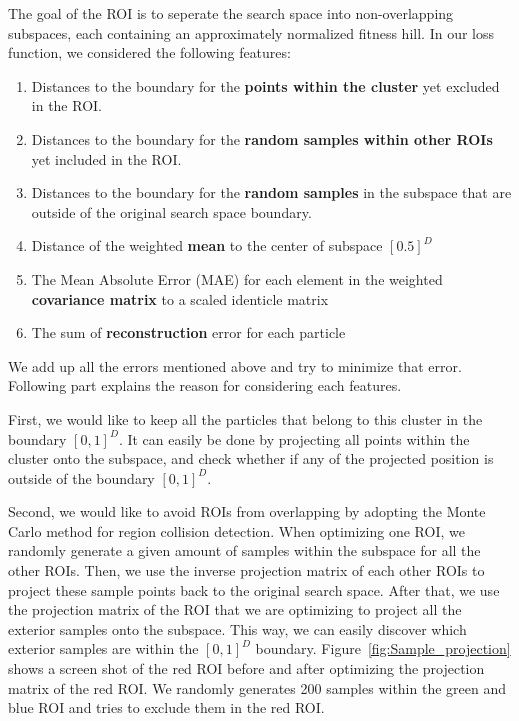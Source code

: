 The goal of the ROI is to seperate the search space into non-overlapping subspaces, 
each containing an approximately normalized fitness hill.
In our loss function, we considered the following features:
\begin{enumerate}
    \item Distances to the boundary for the \textbf{points within the cluster} yet excluded in the ROI.
    \item Distances to the boundary for the \textbf{random samples within other ROIs} yet included in the ROI.
    \item Distances to the boundary for the \textbf{random samples} in the subspace that are outside of the original search space boundary.
    \item Distance of the weighted \textbf{mean} to the center of subspace $[0.5]^D$
    \item The Mean Absolute Error (MAE) for each element in the weighted \textbf{covariance matrix} to a scaled identicle matrix
    \item The sum of \textbf{reconstruction} error for each particle 
\end{enumerate} 
We add up all the errors mentioned above and try to minimize that error. 
Following part explains the reason for considering each features.

First, we would like to keep all the particles that belong to this cluster in the boundary $[0,1]^D$.
It can easily be done by projecting all points within the cluster onto the subspace, 
and check whether if any of the projected position is outside of the boundary $[0,1]^D$.

Second, we would like to avoid ROIs from overlapping by adopting the Monte Carlo method for region collision detection. 
When optimizing one ROI, we randomly generate a given amount of samples within the subspace for all the other ROIs.
Then, we use the inverse projection matrix of each other ROIs to project these sample points back to the original search space.
After that, we use the projection matrix of the ROI that we are optimizing to project all the exterior samples onto the subspace.
This way, we can easily discover which exterior samples are within the $[0, 1]^D$ boundary.
Figure~\ref{fig:Sample_projection} shows a screen shot of the red ROI before and after optimizing the projection matrix of the red ROI.
We randomly generates 200 samples within the green and blue ROI and tries to exclude them in the red ROI.

